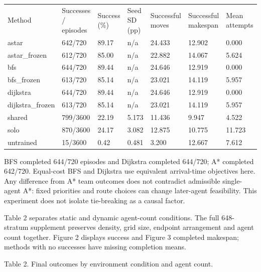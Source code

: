 \documentclass[10pt,a4paper]{article}
\begin{document}
{\footnotesize\begin{longtable}{p{}p{}p{}p{}p{}p{}p{}}
Method & Successes / episodes & Success (\%) & Seed SD (pp) & Successful moves & Successful makespan & Mean attempts \\
astar & 642/720 & 89.17 & n/a & 24.433 & 12.902 & 0.000 \\
astar\_frozen & 612/720 & 85.00 & n/a & 22.882 & 14.067 & 5.624 \\
bfs & 644/720 & 89.44 & n/a & 24.646 & 12.919 & 0.000 \\
bfs\_frozen & 613/720 & 85.14 & n/a & 23.021 & 14.119 & 5.957 \\
dijkstra & 644/720 & 89.44 & n/a & 24.646 & 12.919 & 0.000 \\
dijkstra\_frozen & 613/720 & 85.14 & n/a & 23.021 & 14.119 & 5.957 \\
shared & 799/3600 & 22.19 & 5.173 & 11.436 & 9.947 & 4.522 \\
solo & 870/3600 & 24.17 & 3.082 & 12.875 & 10.775 & 11.723 \\
untrained & 15/3600 & 0.42 & 0.481 & 3.200 & 12.667 & 7.612 \\
\end{longtable}}



BFS completed 644/720 episodes and Dijkstra completed 644/720; A* completed 642/720. Equal-cost BFS and Dijkstra use equivalent arrival-time objectives here. Any difference from A* team outcomes does not contradict admissible single-agent A*: fixed priorities and route choices can change later-agent feasibility. This experiment does not isolate tie-breaking as a causal factor.



Table 2 separates static and dynamic agent-count conditions. The full 648-stratum supplement preserves density, grid size, endpoint arrangement and agent count together. Figure 2 displays success and Figure 3 completed makespan; methods with no successes have missing completion means.



Table 2. Final outcomes by environment condition and agent count.
\end{document}
